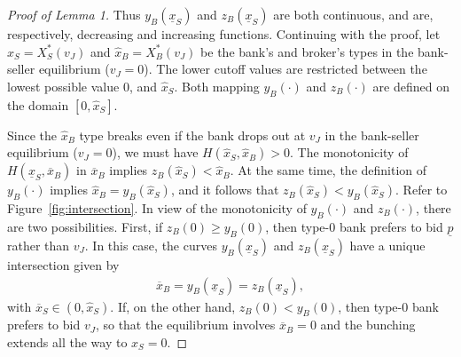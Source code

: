 \documentclass[11pt,twopage]{article}
\newcommand{\ol}{\overline}
\newcommand{\ul}{\underline}
\begin{document}
\begin{proof}[Proof of Lemma 1]
Thus $y_B(\ul x_S)$ and $z_B(\ul x_S)$ are both continuous, and are, respectively,  decreasing and increasing functions. Continuing with the proof, let $\hat x_S = X_S^*(v_J)$ and $\hat x_B = X_B^*(v_J)$ be the bank's and broker's types in the bank-seller equilibrium ($v_J = 0$). The lower cutoff values are restricted between
the lowest possible value $0$, and $\hat x_S$. Both mapping $y_B(\cdot)$ and $z_B(\cdot)$ are defined on the domain $[0,\hat x_S ]$. 



Since the $\hat x_B$ type breaks even if the bank drops out at $v_J$ in the bank-seller equilibrium ($v_J = 0$), we must have $H(\hat x_S,\hat x_B)>0$. The monotonicity of $H(\underline x_S,\ol x_B)$ in $\ol x_B$ implies
$z_B(\hat x_S)<\hat x_B$. At the same time, the definition of $y_B(\cdot)$ implies $\hat x_B = y_B(\hat x_S)$, and it follows that $z_B(\hat x_S)<y_B(\hat x_S)$. 
Refer to Figure~\ref{fig:intersection}. In view of the monotonicity of $y_B(\cdot)$ and $z_B(\cdot)$, there are two possibilities. First, if $z_B(0) \geq  y_B(0)$, then type-$0$ bank prefers to bid $\ul p$ rather than $v_J$. In this case, the curves $y_B(\ul x_S)$ and $z_B(\ul x_S)$ have a unique intersection given by 
\begin{align}
  \ol x_B = y_B(\underline x_S)=z_B(\underline x_S), \label{eq:intersection}
\end{align} 
with $\ol x_S \in (0,\hat x_S)$. If, on the other hand, $z_B(0) <  y_B(0)$, then type-$0$ bank prefers to bid $v_J$, so that the equilibrium involves $\ol x_B = 0$ and the bunching extends all the way to $x_S = 0$.
%


\end{proof}
\end{document}
